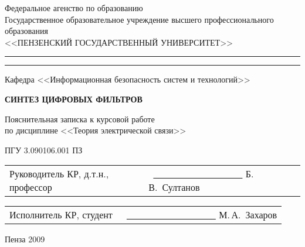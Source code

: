 \newpage
\begin{singlespace}
\begin{center}
Федеральное агенство по образованию  \\
Государственное образовательное учреждение высшего профессионального образования \\
\vspace{0.25cm}
<<ПЕНЗЕНСКИЙ ГОСУДАРСТВЕННЫЙ УНИВЕРСИТЕТ>> \\
\medskip 
    \hrule height 1pt
      \vskip 1pt 
      \hrule
      \vskip 3pt
Кафедра <<Информационная безопасность систем и технологий>>
\end{center}
\end{singlespace}

\vspace{8em}

\begin{center}
\textsc{\textbf{СИНТЕЗ ЦИФРОВЫХ ФИЛЬТРОВ}}
\end{center}

\begin{center}
  Пояснительная записка к курсовой работе \\
  по дисциплине <<Теория электрической связи>>
\end{center}

\begin{center}
ПГУ 3.090106.001 ПЗ
\end{center}

\vspace{6em}
  \begin{tabular}{p{60mm}p{80mm}}
    Руководитель КР, \newline
    д.т.н., профессор
   &
    ~\newline\underline{~~~~~~~~~~~~~~~~~~~} Б.\,В.~Султанов \newline
  \end{tabular}
  
   \begin{tabular}{p{60mm}p{80mm}}
    Исполнитель КР, \newline
    студент
   &
    ~\newline\underline{~~~~~~~~~~~~~~~~~~~} М.\,А.~Захаров \newline
  \end{tabular}

\vspace{\fill}
\begin{center}
Пенза 2009 
\end{center}
\newpage

